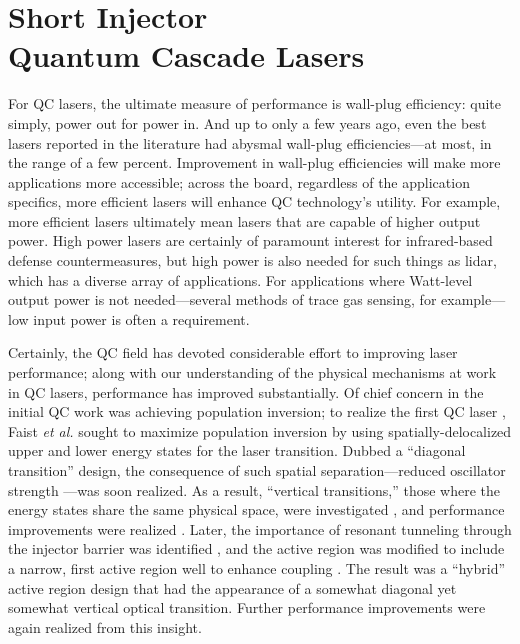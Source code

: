 %
%

\setcounter{chapter}{4}
\chapter[Short Injector Quantum Cascade Lasers]{Short Injector \\ Quantum Cascade Lasers}

For QC lasers, the ultimate measure of performance is wall-plug efficiency: quite simply, power out for power in.  And up to only a few years ago, even the best lasers reported in the literature had abysmal wall-plug efficiencies---at most, in the range of a few percent.  Improvement in wall-plug efficiencies will make more applications more accessible; across the board, regardless of the application specifics, more efficient lasers will enhance QC technology's utility.  For example, more efficient lasers ultimately mean lasers that are capable of higher output power.  High power lasers are certainly of paramount interest for infrared-based defense countermeasures, but high power is also needed for such things as lidar, which has a diverse array of applications.  For applications where Watt-level output power is not needed---several methods of trace gas sensing, for example---low input power is often a requirement.

Certainly, the QC field has devoted considerable effort to improving laser performance; along with our understanding of the physical mechanisms at work in QC lasers, performance has improved substantially.  Of chief concern in the initial QC work was achieving population inversion; to realize the first QC laser \cite{Faist:Science:1994}, Faist \emph{et al.} sought to maximize population inversion by using spatially-delocalized upper and lower energy states for the laser transition.  Dubbed a ``diagonal transition'' design, the consequence of such spatial separation---reduced oscillator strength \cite{Faist:Nature:1997:oscillator}---was soon realized.  As a result, ``vertical transitions,'' those where the energy states share the same physical space, were investigated \cite{Faist:APL:1995:vertical}, and performance improvements were realized \cite{Sirtori:APL:1996:vertical}.  Later, the importance of resonant tunneling through the injector barrier was identified \cite{Sirtori:JQE:1998}, and the active region was modified to include a narrow, first active region well to enhance coupling \cite{Faist:APL:1996:coupling}.  The result was a ``hybrid'' active region design that had the appearance of a somewhat diagonal yet somewhat vertical optical transition.  Further performance improvements were again realized \cite{Gmachl:APL:1998:magic} from this insight.

